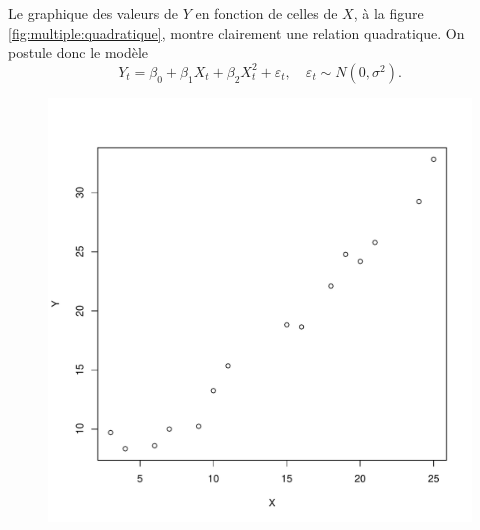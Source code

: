 \begin{solution}{3.16}
    Le graphique des valeurs de $Y$ en fonction de celles de $X$, à la
    figure \ref{fig:multiple:quadratique}, montre clairement une
    relation quadratique. On postule donc le modèle
    \begin{displaymath}
      Y_t = \beta_0 + \beta_1 X_t + \beta_2 X_t^2 + \varepsilon_t, \quad
      \varepsilon_t \sim N(0, \sigma^2).
    \end{displaymath}
    \begin{figure}
      \centering
\begin{knitrout}
\color{fgcolor}\begin{kframe}
\begin{alltt}
 \hlopt{~}   
\end{alltt}
\end{kframe}
\includegraphics[width=\maxwidth]{figure/unnamed-chunk-52-1}


\end{knitrout}
\end{figure}
\end{solution}
